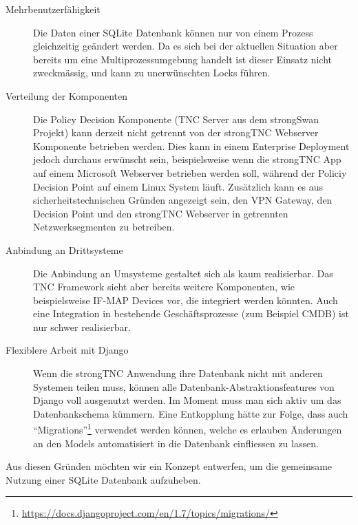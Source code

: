 \begin{description}
	\item[Mehrbenutzerfähigkeit] Die Daten einer SQLite Datenbank können nur von
		einem Prozess gleichzeitig geändert werden. Da es sich bei der aktuellen
		Situation aber bereits um eine Multiprozessumgebung handelt ist dieser
		Einsatz nicht zweckmässig, und kann zu unerwünschten Locks führen.

	\item[Verteilung der Komponenten] Die Policy Decision Komponente (TNC Server
		aus dem strong\-Swan Projekt) kann derzeit nicht getrennt von der strongTNC
		Webserver Komponente betrieben werden. Dies kann in einem Enterprise
		Deployment jedoch durchaus erwünscht sein, beispielsweise wenn die strongTNC
		App auf einem Microsoft Webserver betrieben werden soll, während der Policiy
		Decision Point auf einem Linux System läuft. Zusätzlich kann es aus
		sicherheitstechnischen Gründen angezeigt sein, den VPN Gateway, den Decision
		Point und den strongTNC Webserver in getrennten Netzwerksegmenten zu
		betreiben.

	\item[Anbindung an Drittsysteme] Die Anbindung an Umsysteme gestaltet sich als
		kaum realisierbar. Das TNC Framework sieht aber bereits weitere Komponenten,
		wie beispielsweise IF-MAP Devices vor, die integriert werden könnten. Auch
		eine Integration in bestehende Geschäftsprozesse (zum Beispiel CMDB) ist nur
		schwer realisierbar.
	
	\item[Flexiblere Arbeit mit Django] Wenn die strongTNC Anwendung ihre
		Datenbank nicht mit anderen Systemen teilen muss, können alle
		Datenbank-Abstraktionsfeatures von Django voll ausgenutzt werden. Im Moment
		muss man sich aktiv um das Datenbankschema kümmern. Eine Entkopplung hätte
		zur Folge, dass auch
		\enquote{Migrations}\footnote{\url{https://docs.djangoproject.com/en/1.7/topics/migrations/}}
		verwendet werden können, welche es erlauben Änderungen an den Models
		automatisiert in die Datenbank einfliessen zu lassen.
	
\end{description} 

Aus diesen Gründen möchten wir ein Konzept entwerfen, um die gemeinsame Nutzung
einer SQLite Datenbank aufzuheben.

